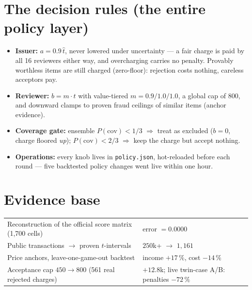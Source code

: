 \documentclass[10pt,a4paper]{article}
\begin{document}
\section*{The decision rules (the entire policy layer)}
\vspace{-4pt}
\begin{itemize}[leftmargin=1.3em, itemsep=1pt]
  \item \textbf{Issuer:} $a = 0.9\,\hat t$, never lowered under uncertainty --- a fair
        charge is paid by all 16 reviewers either way, and overcharging carries no
        penalty. Provably worthless items are still charged (zero-floor): rejection
        costs nothing, careless acceptors pay.
  \item \textbf{Reviewer:} $b = m \cdot \hat t$ with value-tiered $m = 0.9/1.0/1.0$,
        a global cap of $800$, and downward clamps to proven fraud ceilings of similar
        items (anchor evidence).
  \item \textbf{Coverage gate:} ensemble $P(\mathrm{cov}) < 1/3$ $\Rightarrow$ treat as
        excluded ($b=0$, charge floored \emph{up}); $P(\mathrm{cov}) < 2/3$
        $\Rightarrow$ keep the charge but accept nothing.
  \item \textbf{Operations:} every knob lives in \texttt{policy.json}, hot-reloaded
        before each round --- five backtested policy changes went live within one hour.
\end{itemize}

\section*{Evidence base}
\vspace{-4pt}
\begin{center}
\begin{tabular}{@{}p{9.2cm}l@{}}
\toprule
Reconstruction of the official score matrix (1{,}700 cells) & error $= 0.0000$\\
Public transactions $\rightarrow$ proven $t$-intervals & $250$k+ $\rightarrow$ $1{,}161$\\
Price anchors, leave-one-game-out backtest & income $+17\,\%$, cost $-14\,\%$\\
Acceptance cap $450 \rightarrow 800$ (561 real rejected charges) & $+12.8$k; live twin-case A/B: penalties $-72\,\%$\\
\bottomrule
\end{tabular}
\end{center}
\end{document}
